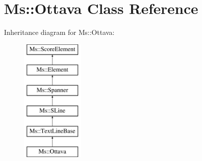 \hypertarget{class_ms_1_1_ottava}{}\section{Ms\+:\+:Ottava Class Reference}
\label{class_ms_1_1_ottava}
Inheritance diagram for Ms\+:\+:Ottava\+:\begin{figure}[H]
\begin{center}
\leavevmode
\includegraphics[height=6.000000cm]{class_ms_1_1_ottava}
\end{center}
\end{figure}
